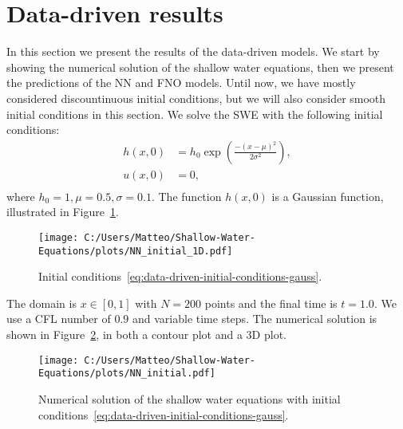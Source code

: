 \section{Data-driven results}
In this section we present the results of the data-driven models.
We start by showing the numerical solution of the shallow water equations, then we present the predictions of the NN and FNO models.
Until now, we have mostly considered discountinuous initial conditions, but we will also consider smooth initial conditions in this section.
We solve the SWE with the following initial conditions:
\begin{equation}\label{eq:data-driven-initial-conditions-gauss}
    \begin{aligned}
        h(x, 0) &= h_0 \exp \left( \frac{-{(x-\mu)}^2}{2 \sigma^2} \right) ,\\
        u(x, 0) &= 0 , \\
    \end{aligned}
\end{equation}
where $h_0 = 1, \mu = 0.5, \sigma = 0.1$. 
The function $h(x, 0)$ is a Gaussian function, illustrated in Figure~\ref{fig:NN_initial_1D}.
\begin{figure}[H]
    \centering
    \texttt{[image: C:/Users/Matteo/Shallow-Water-Equations/plots/NN\_initial\_1D.pdf]}
    \caption{Initial conditions~\eqref{eq:data-driven-initial-conditions-gauss}.} \label{fig:NN_initial_1D}
\end{figure}
The domain is $ x \in [0, 1]$ with $N = 200$ points and the final time is $t = 1.0$.
We use a CFL number of $0.9$ and variable time steps.
The numerical solution is shown in Figure~\ref{fig:NN_initial}, in both a contour plot and a 3D plot.
\begin{figure}[H]
    \centering
    \texttt{[image: C:/Users/Matteo/Shallow-Water-Equations/plots/NN\_initial.pdf]}
    \caption{Numerical solution of the shallow water equations with initial conditions~\eqref{eq:data-driven-initial-conditions-gauss}.}\label{fig:NN_initial}
\end{figure}


